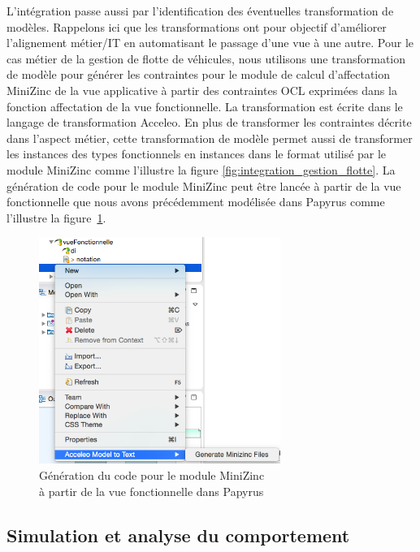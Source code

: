 L'intégration passe aussi par l'identification des éventuelles transformation de
modèles. Rappelons ici que les transformations ont pour objectif d'améliorer
l'alignement métier/IT en automatisant le passage d'une vue à une autre. Pour le
cas métier de la gestion de flotte de véhicules, nous utilisons une
transformation de modèle pour générer les contraintes pour le module de calcul
d'affectation MiniZinc de la vue applicative à partir des contraintes OCL
exprimées dans la fonction affectation de la vue fonctionnelle. La
transformation est écrite dans le langage de transformation Acceleo. En plus de
transformer les contraintes décrite dans l'aspect métier, cette transformation
de modèle permet aussi de transformer les instances des types fonctionnels en
instances dans le format  utilisé par le module MiniZinc comme
l'illustre la figure \ref{fig:integration_gestion_flotte}. La génération de code
pour le module MiniZinc peut être lancée à partir de la vue fonctionnelle que
nous avons précédemment modélisée dans Papyrus comme l'illustre la
figure~\ref{fig:acceleo_papyrus}.

\begin{figure}[!htbp]
 \begin{center}
  \includegraphics[width=0.7\textwidth]{figures/5_implementation/acceleo_papyrus.png}
 \end{center}
 \caption{Génération du code pour le module MiniZinc\\à partir de la vue fonctionnelle dans Papyrus}
 \label{fig:acceleo_papyrus}
\end{figure}


\subsection{Simulation et analyse du comportement}

